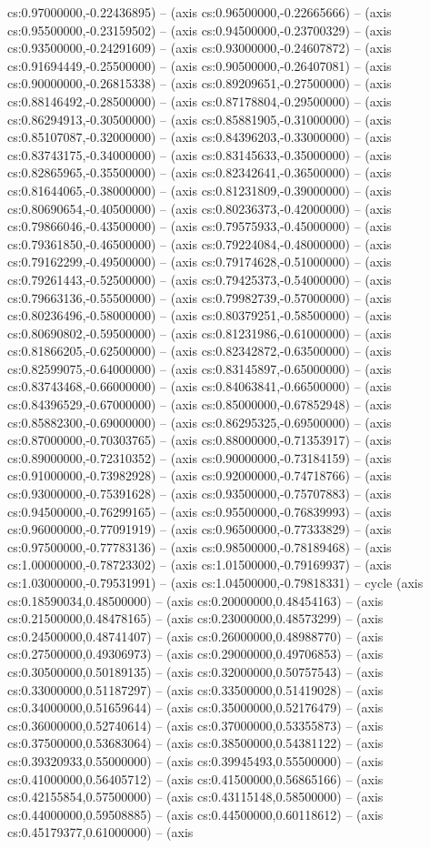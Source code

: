 cs:0.97000000,-0.22436895) -- (axis cs:0.96500000,-0.22665666) -- (axis cs:0.95500000,-0.23159502) -- (axis cs:0.94500000,-0.23700329) -- (axis cs:0.93500000,-0.24291609) -- (axis cs:0.93000000,-0.24607872) -- (axis cs:0.91694449,-0.25500000) -- (axis cs:0.90500000,-0.26407081) -- (axis cs:0.90000000,-0.26815338) -- (axis cs:0.89209651,-0.27500000) -- (axis cs:0.88146492,-0.28500000) -- (axis cs:0.87178804,-0.29500000) -- (axis cs:0.86294913,-0.30500000) -- (axis cs:0.85881905,-0.31000000) -- (axis cs:0.85107087,-0.32000000) -- (axis cs:0.84396203,-0.33000000) -- (axis cs:0.83743175,-0.34000000) -- (axis cs:0.83145633,-0.35000000) -- (axis cs:0.82865965,-0.35500000) -- (axis cs:0.82342641,-0.36500000) -- (axis cs:0.81644065,-0.38000000) -- (axis cs:0.81231809,-0.39000000) -- (axis cs:0.80690654,-0.40500000) -- (axis cs:0.80236373,-0.42000000) -- (axis cs:0.79866046,-0.43500000) -- (axis cs:0.79575933,-0.45000000) -- (axis cs:0.79361850,-0.46500000) -- (axis cs:0.79224084,-0.48000000) -- (axis cs:0.79162299,-0.49500000) -- (axis cs:0.79174628,-0.51000000) -- (axis cs:0.79261443,-0.52500000) -- (axis cs:0.79425373,-0.54000000) -- (axis cs:0.79663136,-0.55500000) -- (axis cs:0.79982739,-0.57000000) -- (axis cs:0.80236496,-0.58000000) -- (axis cs:0.80379251,-0.58500000) -- (axis cs:0.80690802,-0.59500000) -- (axis cs:0.81231986,-0.61000000) -- (axis cs:0.81866205,-0.62500000) -- (axis cs:0.82342872,-0.63500000) -- (axis cs:0.82599075,-0.64000000) -- (axis cs:0.83145897,-0.65000000) -- (axis cs:0.83743468,-0.66000000) -- (axis cs:0.84063841,-0.66500000) -- (axis cs:0.84396529,-0.67000000) -- (axis cs:0.85000000,-0.67852948) -- (axis cs:0.85882300,-0.69000000) -- (axis cs:0.86295325,-0.69500000) -- (axis cs:0.87000000,-0.70303765) -- (axis cs:0.88000000,-0.71353917) -- (axis cs:0.89000000,-0.72310352) -- (axis cs:0.90000000,-0.73184159) -- (axis cs:0.91000000,-0.73982928) -- (axis cs:0.92000000,-0.74718766) -- (axis cs:0.93000000,-0.75391628) -- (axis cs:0.93500000,-0.75707883) -- (axis cs:0.94500000,-0.76299165) -- (axis cs:0.95500000,-0.76839993) -- (axis cs:0.96000000,-0.77091919) -- (axis cs:0.96500000,-0.77333829) -- (axis cs:0.97500000,-0.77783136) -- (axis cs:0.98500000,-0.78189468) -- (axis cs:1.00000000,-0.78723302) -- (axis cs:1.01500000,-0.79169937) -- (axis cs:1.03000000,-0.79531991) -- (axis cs:1.04500000,-0.79818331) -- cycle (axis cs:0.18590034,0.48500000) -- (axis cs:0.20000000,0.48454163) -- (axis cs:0.21500000,0.48478165) -- (axis cs:0.23000000,0.48573299) -- (axis cs:0.24500000,0.48741407) -- (axis cs:0.26000000,0.48988770) -- (axis cs:0.27500000,0.49306973) -- (axis cs:0.29000000,0.49706853) -- (axis cs:0.30500000,0.50189135) -- (axis cs:0.32000000,0.50757543) -- (axis cs:0.33000000,0.51187297) -- (axis cs:0.33500000,0.51419028) -- (axis cs:0.34000000,0.51659644) -- (axis cs:0.35000000,0.52176479) -- (axis cs:0.36000000,0.52740614) -- (axis cs:0.37000000,0.53355873) -- (axis cs:0.37500000,0.53683064) -- (axis cs:0.38500000,0.54381122) -- (axis cs:0.39320933,0.55000000) -- (axis cs:0.39945493,0.55500000) -- (axis cs:0.41000000,0.56405712) -- (axis cs:0.41500000,0.56865166) -- (axis cs:0.42155854,0.57500000) -- (axis cs:0.43115148,0.58500000) -- (axis cs:0.44000000,0.59508885) -- (axis cs:0.44500000,0.60118612) -- (axis cs:0.45179377,0.61000000) -- (axis 